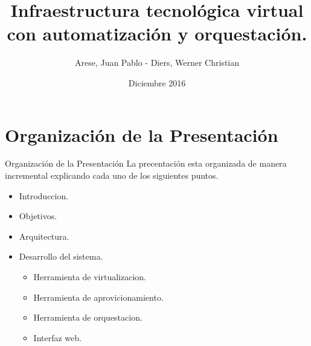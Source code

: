 \title[Your Short Title]{Infraestructura tecnológica virtual con automatización y orquestación.}
\author{Arese, Juan Pablo - Diers, Werner Christian}
\date{Diciembre 2016}




\begin{frame}
  \titlepage
\end{frame}


\section{Organización de la Presentación}

\begin{frame}{Organización de la Presentación}
    \vspace{-1.5cm}
    La precentación esta organizada de manera incremental explicando cada uno de los siguientes puntos.\\
    \begin{itemize}
        \item Introduccion.
        \item Objetivos.
        \item Arquitectura.
        \item Desarrollo del sistema.
        \begin{itemize}
            \item Herramienta de virtualizacion.
            \item Herramienta de aprovicionamiento.
            \item Herramienta de orquestacion.
            \item Interfaz web.
        \end{itemize}
    \end{itemize}

\end{frame}


